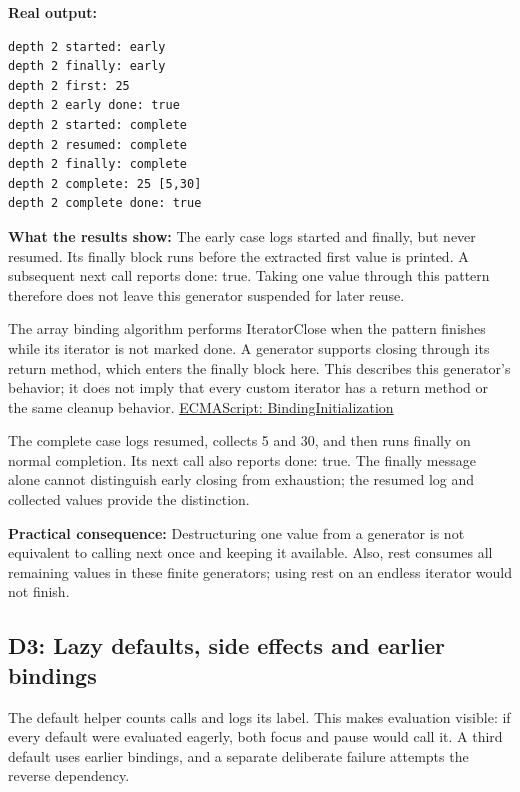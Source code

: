\documentclass[10pt,a4paper]{article}
\begin{document}

\textbf{Real output:}

\begin{lstlisting}[language={}]
depth 2 started: early
depth 2 finally: early
depth 2 first: 25
depth 2 early done: true
depth 2 started: complete
depth 2 resumed: complete
depth 2 finally: complete
depth 2 complete: 25 [5,30]
depth 2 complete done: true
\end{lstlisting}

\textbf{What the results show:} The early case logs started and finally, but never resumed. Its finally block runs before the extracted first value is printed. A subsequent next call reports done: true. Taking one value through this pattern therefore does not leave this generator suspended for later reuse.

The array binding algorithm performs IteratorClose when the pattern finishes while its iterator is not marked done. A generator supports closing through its return method, which enters the finally block here. This describes this generator's behavior; it does not imply that every custom iterator has a return method or the same cleanup behavior. \href{https://tc39.es/ecma262/multipage/syntax-directed-operations.html\#sec-runtime-semantics-bindinginitialization}{ECMAScript: BindingInitialization}

The complete case logs resumed, collects 5 and 30, and then runs finally on normal completion. Its next call also reports done: true. The finally message alone cannot distinguish early closing from exhaustion; the resumed log and collected values provide the distinction.

\textbf{Practical consequence:} Destructuring one value from a generator is not equivalent to calling next once and keeping it available. Also, rest consumes all remaining values in these finite generators; using rest on an endless iterator would not finish.

\subsection{D3: Lazy defaults, side effects and earlier bindings}

The default helper counts calls and logs its label. This makes evaluation visible: if every default were evaluated eagerly, both focus and pause would call it. A third default uses earlier bindings, and a separate deliberate failure attempts the reverse dependency.
\end{document}
